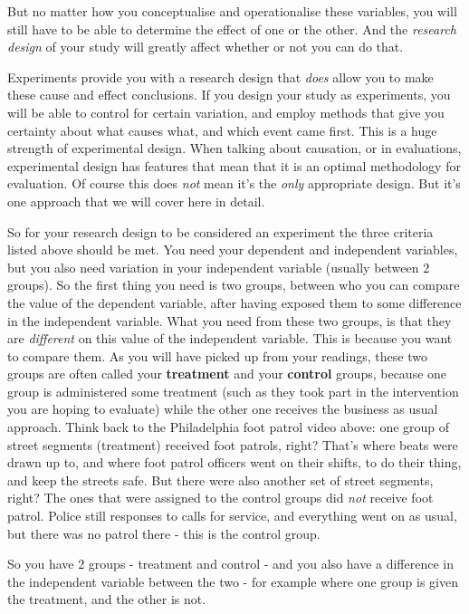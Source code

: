 \documentclass[]{book}
\theoremstyle{definition}
\theoremstyle{definition}
\theoremstyle{definition}
\theoremstyle{remark}
\begin{document}
But no matter how you conceptualise and operationalise these variables,
you will still have to be able to determine the effect of one or the
other. And the \emph{research design} of your study will greatly affect
whether or not you can do that.

Experiments provide you with a research design that \emph{does} allow
you to make these cause and effect conclusions. If you design your study
as experiments, you will be able to control for certain variation, and
employ methods that give you certainty about what causes what, and which
event came first. This is a huge strength of experimental design. When
talking about causation, or in evaluations, experimental design has
features that mean that it is an optimal methodology for evaluation. Of
course this does \emph{not} mean it's the \emph{only} appropriate
design. But it's one approach that we will cover here in detail.

So for your research design to be considered an experiment the three
criteria listed above should be met. You need your dependent and
independent variables, but you also need variation in your independent
variable (usually between 2 groups). So the first thing you need is two
groups, between who you can compare the value of the dependent variable,
after having exposed them to some difference in the independent
variable. What you need from these two groups, is that they are
\emph{different} on this value of the independent variable. This is
because you want to compare them. As you will have picked up from your
readings, these two groups are often called your \textbf{treatment} and
your \textbf{control} groups, because one group is administered some
treatment (such as they took part in the intervention you are hoping to
evaluate) while the other one receives the business as usual approach.
Think back to the Philadelphia foot patrol video above: one group of
street segments (treatment) received foot patrols, right? That's where
beats were drawn up to, and where foot patrol officers went on their
shifts, to do their thing, and keep the streets safe. But there were
also another set of street segments, right? The ones that were assigned
to the control groups did \emph{not} receive foot patrol. Police still
responses to calls for service, and everything went on as usual, but
there was no patrol there - this is the control group.

So you have 2 groups - treatment and control - and you also have a
difference in the independent variable between the two - for example
where one group is given the treatment, and the other is not.
\end{document}
